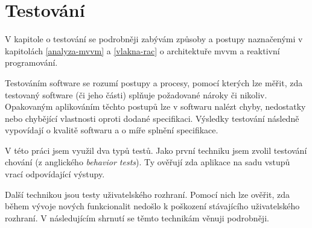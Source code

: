 \chapter{Testování}\label{testovani}



V kapitole o testování se podrobněji zabývám způsoby a postupy naznačenými v kapitolách \ref{analyza-mvvm} a \ref{vlakna-rac} o architektuře \acrshort{mvvm} a reaktivní programování.

Testováním software se rozumí postupy a procesy, pomocí kterých lze měřit, zda testovaný software (či jeho části) splňuje požadované nároky či nikoliv.
Opakovaným aplikováním těchto postupů lze v softwaru nalézt chyby, nedostatky nebo chybějící vlastnosti oproti dodané specifikaci.
Výsledky testování následně vypovídají o kvalitě softwaru a o míře splnění specifikace. \cite{software-testing-definition}

\bigskip

V této práci jsem využil dva typů testů.
Jako první techniku jsem zvolil testování chování (z anglického \textit{behavior tests}).
Ty ověřují zda aplikace na sadu vstupů vrací odpovídající výstupy.

Další technikou jsou testy uživatelského rozhraní.
Pomocí nich lze ověřit, zda během vývoje nových funkcionalit nedošlo k poškození stávajícího uživatelského rozhraní.
V následujícím shrnutí se těmto technikám věnuji podrobněji.









